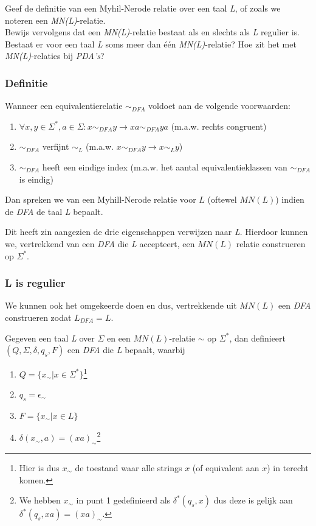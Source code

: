 
\begin{quest}
  Geef de definitie van een Myhil-Nerode relatie over een taal \emph{L}, of zoals we noteren een \emph{MN(L)}-relatie. \\
  Bewijs vervolgens dat een \emph{MN(L)}-relatie bestaat als en slechts als \emph{L} regulier is. Bestaat er voor een taal \emph{L} soms meer dan één \emph{MN(L)}-relatie? Hoe zit het met \emph{MN(L)}-relaties bij \emph{PDA’s}?
\end{quest}

\subsubsection*{Definitie}

\begin{theorem}
  Wanneer een equivalentierelatie $\sim_{DFA}$ voldoet aan de volgende voorwaarden:
  \begin{enumerate}
    \item $\forall x, y \in \Sigma^*, a \in \Sigma : x \sim_{DFA} y \rightarrow xa \sim_{DFA} ya$ (m.a.w. rechts congruent)
    \item $\sim_{DFA}$ verfijnt $\sim_L$ (m.a.w. $x \sim_{DFA} y \rightarrow x \sim_L y$)
    \item $\sim_{DFA}$ heeft een eindige index (m.a.w. het aantal equivalentieklassen van $\sim_{DFA}$ is eindig)
  \end{enumerate}
  Dan spreken we van een Myhill-Nerode relatie voor $L$ (oftewel $MN(L)$) indien de \emph{DFA} de taal \emph{L} bepaalt.
\end{theorem}

Dit heeft zin aangezien de drie eigenschappen verwijzen naar \emph{L}. Hierdoor kunnen we, vertrekkend van een \emph{DFA} die \emph{L} accepteert, een $MN(L)$ relatie construeren op $\Sigma^*$.

\subsubsection*{L is regulier}

We kunnen ook het omgekeerde doen en dus, vertrekkende uit $MN(L)$ een \emph{DFA} construeren zodat $L_{DFA} = L$.

\begin{theorem}
  Gegeven een taal \emph{L} over $\Sigma$ en een $MN(L)$-relatie $\sim$ op $\Sigma^*$, dan definieert $(Q,\Sigma,\delta,q_s,F)$ een \emph{DFA} die \emph{L} bepaalt, waarbij
  \begin{enumerate}
    \item $Q = \{x_{\sim}|x \in \Sigma^*\}$\footnote{Hier is dus $x_{\sim}$ de toestand waar alle strings $x$ (of equivalent aan $x$) in terecht komen.}
    \item $q_s = \epsilon_{\sim}$
    \item $F = \{x_{\sim}|x \in L\}$
    \item $\delta(x_{\sim},a) = (xa)_{\sim}$\footnote{We hebben $x_{\sim}$ in punt 1 gedefinieerd als $\delta^*(q_s,x)$ dus deze is gelijk aan $\delta^*(q_s,xa) = (xa)_{\sim}$.}
  \end{enumerate}
\end{theorem}


